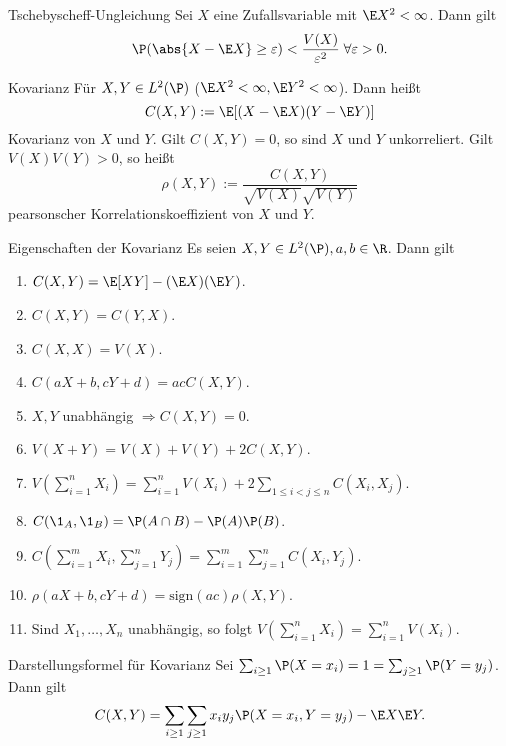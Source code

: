 \begin{karte}{Tschebyscheff-Ungleichung}
    Sei \( X \) eine Zufallsvariable mit \( \E X^2 < \infty \). Dann gilt 
    \[ \P(\abs{ X - \E X }\geq \varepsilon ) < \frac{V(X)}{\varepsilon^2}\; \forall \varepsilon > 0. \]
\end{karte}

\begin{karte}{Kovarianz}
    Für \( X,Y \in L^2(\P) \) (\( \E X^2 < \infty, \E Y^2 < \infty \)). 
    Dann heißt 
    \[ C(X,Y) := \E [ (X - \E X)(Y - \E Y) ] \]
    Kovarianz von \(X\) und \(Y\). 
    Gilt \( C(X,Y) = 0 \), so sind \(X\) und \(Y\) unkorreliert. Gilt 
    \( V(X) V(Y) > 0 \), so heißt 
    \[ \rho(X,Y) := \frac{C(X,Y)}{\sqrt{V(X)}\sqrt{V(Y)}} \]
    pearsonscher Korrelationskoeffizient von \(X\) und \(Y\).
\end{karte}

\begin{karte}{Eigenschaften der Kovarianz}
    Es seien \( X,Y \in L^2(\P), a,b\in \R \). Dann gilt 
    \begin{enumerate}
        \item \( C(X,Y) = \E[X Y] - (\E X)(\E Y) \).
        \item \( C(X,Y) = C(Y,X) \).
        \item \( C(X,X) = V(X) \).
        \item \( C(aX + b, cY + d) = ac C(X,Y) \).
        \item \( X,Y \) unabhängig \( \Rightarrow C(X,Y) = 0 \).
        \item \( V(X + Y) = V(X) + V(Y) + 2C(X,Y) \).
        \item \( V(\sum_{i=1}^n X_i) = \sum_{i=1}^n V(X_i) + 2\sum_{1\leq i < j \leq n} C(X_i, X_j) \).
        \item \( C(\1_A, \1_B) = \P(A \cap B) - \P(A) \P(B) \).
        \item \( C(\sum_{i=1}^m X_i, \sum_{j=1}^n Y_j) = \sum_{i=1}^m \sum_{j=1}^n C(X_i, Y_j) \).
        \item \( \rho(aX + b, cY + d) = \mathrm{sign}(ac)\rho(X,Y) \).
        \item Sind \( X_1,\ldots,X_n \) unabhängig, so folgt 
        \( V(\sum_{i=1}^n X_i) = \sum_{i=1}^n V(X_i) \).
    \end{enumerate}
\end{karte}

\begin{karte}{Darstellungsformel für Kovarianz} %
    Sei \( \sum_{i\geq 1} \P(X = x_i) = 1 = \sum_{j\geq 1} \P(Y = y_j) \). Dann gilt 
    \[ C(X,Y) = \sum_{i \geq 1} \sum_{j \geq 1} x_i y_j \P(X = x_i, Y = y_j) - \E X \E Y. \]
\end{karte}

